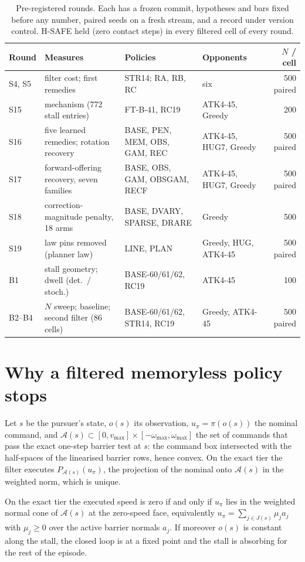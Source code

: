 \documentclass{l4dc2027}
\newcommand{\vmax}{v_{\max}}
\newcommand{\wmax}{\omega_{\max}}
\newcommand{\adm}{\mathcal{A}}
\begin{document}
\begin{table}[t]
\centering\footnotesize
\caption{Pre-registered rounds. Each has a frozen commit, hypotheses and bars fixed before any number, paired seeds on a fresh stream, and a record under version control. H-SAFE held (zero contact steps) in every filtered cell of every round.}
\label{tab:rounds}
\begin{tabular}{@{}l p{5.6cm} p{4.5cm} p{2.5cm} r@{}}
\toprule
Round & Measures & Policies & Opponents & $N$ / cell \\
\midrule
S4, S5 & filter cost; first remedies & STR14; RA, RB, RC & six & 500 paired \\
S15 & mechanism (772 stall entries) & FT-B-41, RC19 & ATK4-45, Greedy & 200 \\
S16 & five learned remedies; rotation recovery & BASE, PEN, MEM, OBS, GAM, REC & ATK4-45, HUG7, Greedy & 500 paired \\
S17 & forward-offering recovery, seven families & BASE, OBS, GAM, OBSGAM, RECF & ATK4-45, HUG7, Greedy & 500 paired \\
S18 & correction-magnitude penalty, 18 arms & BASE, DVARY, SPARSE, DRARE & Greedy & 500 \\
S19 & law pins removed (planner law) & LINE, PLAN & Greedy, HUG, ATK4-45 & 500 paired \\
B1 & stall geometry; dwell (det.\ / stoch.) & BASE-60/61/62, RC19 & ATK4-45 & 100 \\
B2--B4 & $N$ sweep; baseline; second filter (86 cells) & BASE-60/61/62, STR14, RC19 & Greedy, ATK4-45 & 500 paired \\
\bottomrule
\end{tabular}
\end{table}

\section{Why a filtered memoryless policy stops}\label{sec:formal}

Let $s$ be the pursuer's state, $o(s)$ its observation, $u_\pi = \pi(o(s))$ the nominal command, and $\adm(s) \subset [0,\vmax] \times [-\wmax,\wmax]$ the set of commands that pass the exact one-step barrier test at $s$: the command box intersected with the half-spaces of the linearised barrier rows, hence convex. On the exact tier the filter executes $P_{\adm(s)}(u_\pi)$, the projection of the nominal onto $\adm(s)$ in the weighted norm, which is unique.

\begin{proposition}\label{prop:stall}
On the exact tier the executed speed is zero if and only if $u_\pi$ lies in the weighted normal cone of $\adm(s)$ at the zero-speed face, equivalently $u_\pi = \sum_{j \in J(s)} \mu_j a_j$ with $\mu_j \ge 0$ over the active barrier normals $a_j$. If moreover $o(s)$ is constant along the stall, the closed loop is at a fixed point and the stall is absorbing for the rest of the episode.
\end{proposition}
\end{document}
